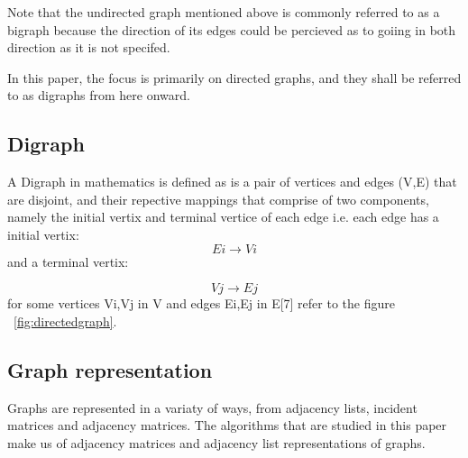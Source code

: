 Note that the undirected graph mentioned above is commonly referred to as a bigraph because the direction
of its edges  could be percieved as to goiing in both direction as it is not specifed.

In this paper, the focus is primarily on directed graphs, and they shall be referred to as digraphs from here onward.

\subsection{Digraph}
A Digraph in mathematics is defined as is a pair of vertices and edges (V,E) that are disjoint, and their repective mappings that comprise of two components, namely the initial vertix and 
terminal vertice of each edge i.e. each edge has a initial vertix: 
  \begin{equation}
    Ei\rightarrow Vi
  \end{equation} 
 and a terminal vertix:

  \begin{equation}
    Vj\rightarrow Ej
  \end{equation} 
   for some vertices Vi,Vj in V and edges Ei,Ej in E[7] refer to the figure ~\ref{fig:directedgraph}.

\subsection{Graph representation}
Graphs are represented in a variaty of ways, from adjacency lists, incident matrices and adjacency matrices. The algorithms that are studied in this paper make us of adjacency matrices and
adjacency list representations of graphs. 

